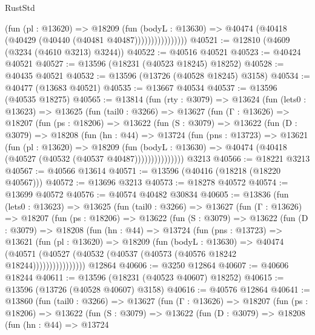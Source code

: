 \begin{lexlean}{RustStd}
\begin{coremodule}
                        (fun (pl : @13620) =>
                        @18209
                          (fun (bodyL : @13630) =>
                          @40474 (@40418 (@40429 (@40440 (@40481 @40487))))))))))))))))
@40521 := @12810 (@4609 (@3234 (@4610 @3213) @3244))
@40522 := @40516 @40521
@40523 := @40424 @40521
@40527 := @13596 (@18231 (@40523 @18245) @18252)
@40528 := @40435 @40521
@40532 := @13596 (@13726 (@40528 @18245) @3158)
@40534 := @40477 (@13683 @40521)
@40535 := @13667 @40534
@40537 := @13596 (@40535 @18275)
@40565 := @13814
    (fun (rty : @3079) =>
    @13624
      (fun (lets0 : @13623) =>
      @13625
        (fun (tail0 : @3266) =>
        @13627
          (fun (Γ : @13626) =>
          @18207
            (fun (ps : @18206) =>
            @13622
              (fun (S : @3079) =>
              @13622
                (fun (D : @3079) =>
                @18208
                  (fun (hn : @44) =>
                  @13724
                    (fun (pns : @13723) =>
                    @13621
                      (fun (pl : @13620) =>
                      @18209
                        (fun (bodyL : @13630) =>
                        @40474 (@40418 (@40527 (@40532 (@40537 @40487)))))))))))))))
    @3213
@40566 := @18221 @3213
@40567 := @40566 @13614
@40571 := @13596 (@40416 (@18218 (@18220 @40567)))
@40572 := @13696 @3213
@40573 := @18278 @40572
@40574 := @13699 @40572
@40576 := @40574 @40482 @30834
@40605 := @13836
    (fun (lets0 : @13623) =>
    @13625
      (fun (tail0 : @3266) =>
      @13627
        (fun (Γ : @13626) =>
        @18207
          (fun (ps : @18206) =>
          @13622
            (fun (S : @3079) =>
            @13622
              (fun (D : @3079) =>
              @18208
                (fun (hn : @44) =>
                @13724
                  (fun (pns : @13723) =>
                  @13621
                    (fun (pl : @13620) =>
                    @18209
                      (fun (bodyL : @13630) =>
                      @40474
                        (@40571
                          (@40527 (@40532 (@40537 (@40573 (@40576 @18242 @18244))))))))))))))))
    @12864
@40606 := @3250 @12864
@40607 := @40606 @18244
@40611 := @13596 (@18231 (@40523 @40607) @18252)
@40615 := @13596 (@13726 (@40528 @40607) @3158)
@40616 := @40576 @12864
@40641 := @13860
    (fun (tail0 : @3266) =>
    @13627
      (fun (Γ : @13626) =>
      @18207
        (fun (ps : @18206) =>
        @13622
          (fun (S : @3079) =>
          @13622
            (fun (D : @3079) =>
            @18208
              (fun (hn : @44) =>
              @13724

\end{coremodule}
\end{lexlean}
